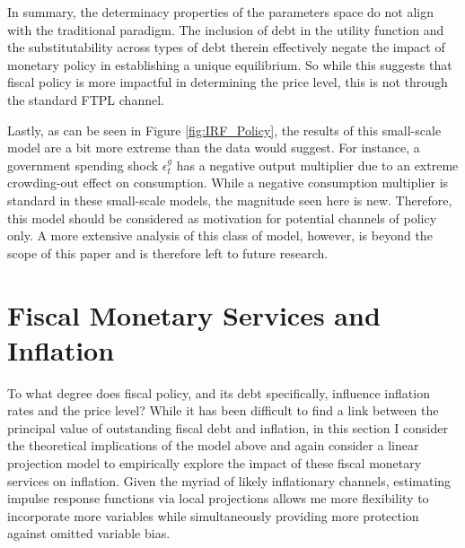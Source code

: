 \documentclass[11pt,a4paper,margin=1.5in]{article}
\begin{document}
%

In summary, the determinacy properties of the parameters space do not align with the traditional \citet{Leeper:1991} paradigm. 
The inclusion of debt in the utility function and the substitutability across types of debt therein effectively negate the impact of monetary policy in establishing a unique equilibrium. 
So while this suggests that fiscal policy is more impactful in determining the price level, this is not through the standard FTPL channel. 

Lastly, as can be seen in Figure \ref{fig:IRF_Policy}, the results of this small-scale model are a bit more extreme than the data would suggest. 
For instance, a government spending shock $\epsilon^g_t$ has a negative output multiplier due to an extreme crowding-out effect on consumption.
While a negative consumption multiplier is standard in these small-scale models, the magnitude seen here is new. 
Therefore, this model should be considered as motivation for potential channels of policy only.
A more extensive analysis of this class of model, however, is beyond the scope of this paper and is therefore left to future research.

\section{Fiscal Monetary Services and Inflation}
\label{sec:Empirical}
To what degree does fiscal policy, and its debt specifically, influence inflation rates and the price level?
While it has been difficult to find a link between the principal value of outstanding fiscal debt and inflation, in this section I consider the theoretical implications of the model above and again consider a \citet{Jorda:2005} linear projection model to empirically explore the impact of these fiscal monetary services on inflation.
Given the myriad of likely inflationary channels, estimating impulse response functions via local projections allows me more flexibility to incorporate more variables while simultaneously providing more protection against omitted variable bias.
\end{document}
